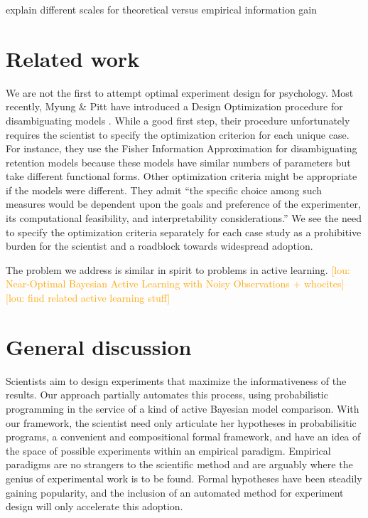 \documentclass{article}
\newcommand{\lou}[1]{\textcolor{orange}{[lou: #1]}}
\newcommand{\cas}[1]{ \textsf{\color{darkgray} \scriptsize #1} }
\begin{document}
\cas{explain different scales for theoretical versus empirical information gain}

\section{Related work}



We are not the first to attempt optimal experiment design for psychology.
Most recently, Myung \& Pitt have introduced a Design Optimization procedure for disambiguating models \cite{Myung2009}.
While a good first step, their procedure unfortunately requires the scientist to specify the optimization criterion for each unique case. For instance, they use the Fisher Information Approximation for disambiguating retention models because these models have similar numbers of parameters but take different functional forms. Other optimization criteria might be appropriate if the models were different. They admit ``the specific choice among such measures would be dependent upon the goals and preference of the experimenter, its computational feasibility, and interpretability considerations.''
We see the need to specify the optimization criteria separately for each case study as a prohibitive burden for the scientist and a roadblock towards widespread adoption.

The problem we address is similar in spirit to problems in active learning.
\lou{Near-Optimal Bayesian Active Learning with Noisy Observations + whocites}
\lou{find related active learning stuff}


\section{General discussion}

%



Scientists aim to design experiments that maximize the informativeness of the results.
Our approach partially automates this process, using probabilistic programming in the service of a kind of active Bayesian model comparison.
With our framework, the scientist need only articulate her hypotheses in probabilisitic programs, a convenient and compositional formal framework, and have an idea of the space of possible experiments within an empirical paradigm.
Empirical paradigms are no strangers to the scientific method and are arguably where the genius of experimental work is to be found.
Formal hypotheses have been steadily gaining popularity, and the inclusion of an automated method for experiment design will only accelerate this adoption.
\end{document}
